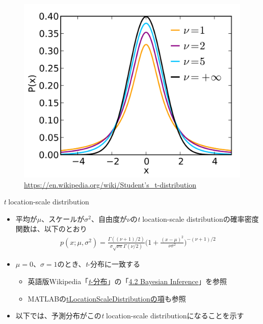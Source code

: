\documentclass[aspectratio=169,unicode,dvipdfmx,14pt]{beamer}
\begin{document}
\begin{frame}{}
\begin{figure}[htbp]
\begin{center}
\includegraphics[scale=.09]{Student_t_pdf.jpg}
\caption{\href{https://en.wikipedia.org/wiki/Student's_t-distribution}{https://en.wikipedia.org/wiki/Student's\_t-distribution}}
\label{}
\end{center}
\end{figure}
\end{frame}


\begin{frame}{\textit{t} location-scale distribution}
\begin{itemize}
\item 平均が$\mu$、スケールが$\sigma^2$、自由度が$\nu$の\textit{t} location-scale distributionの確率密度関数は、以下のとおり
\begin{align}
p(x;\mu,\sigma^2) =\frac{\Gamma((\nu+1)/2)}{\sigma\sqrt{\nu\pi}\Gamma(\nu/2)} \bigg( 1 + \frac{(x - \mu)^2}{\nu\sigma^2} \bigg)^{ - (\nu+1) / 2 }
\end{align}
\item $\mu=0$、$\sigma=1$のとき、\textit{t}-分布に一致する
\begin{itemize}
\item 英語版Wikipedia「\href{https://en.wikipedia.org/wiki/Student's_t-distribution}{\textit{t}-分布}」の「\href{https://en.wikipedia.org/wiki/Student's_t-distribution\#Bayesian_inference}{4.2 Bayesian Inference}」を参照
\item MATLABの\href{https://www.mathworks.com/help/stats/prob.tlocationscaledistribution.html}{tLocationScaleDistributionの項}も参照
\end{itemize}
\item 以下では、予測分布がこの\textit{t} location-scale distributionになることを示す
\end{itemize}
\end{frame}
\end{document}
